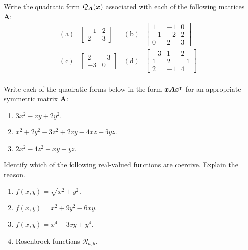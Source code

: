 \begin{problem}[Basic]\cite[p.31, \#3]{peressini1988mathematics}
Write the quadratic form $\mathcal{Q}_{\boldsymbol{A}}(\boldsymbol{x})$ associated with each of the following matrices $\boldsymbol{A}$:
\begin{align*}
\mathrm{(a)} & \begin{bmatrix} -1 & 2 \\ 2 & 3 \end{bmatrix} &
\mathrm{(b)} & \begin{bmatrix} 1 & -1 & 0 \\ -1 & -2 & 2 \\ 0 & 2 & 3 \end{bmatrix} \\
\mathrm{(c)} & \begin{bmatrix} 2 & -3 \\ -3 & 0 \end{bmatrix} &
\mathrm{(d)} & \begin{bmatrix} -3 & 1 & 2 \\ 1 & 2 & -1 \\ 2 & -1 & 4 \end{bmatrix} \\
\end{align*}
\end{problem}

\begin{problem}[Basic]\cite[p.32, \#4]{peressini1988mathematics}
Write each of the quadratic forms below in the form $\boldsymbol{x} \boldsymbol{A} {\boldsymbol{x}}^\intercal$ for an appropriate symmetric matrix $\boldsymbol{A}$:
\begin{enumerate}
\item $3x^2-xy+2y^2$.
\item $x^2+2y^2-3z^2+2xy-4xz+6yz$.
\item $2x^2-4z^2+xy-yz$.
\end{enumerate}
\end{problem}


\begin{problem}[Intermediate]
Identify which of the following real-valued functions are coercive.  Explain the reason.
\begin{enumerate}
	\item $f(x,y) = \sqrt{x^2+y^2}$.
	\item $f(x,y) = x^2 + 9y^2 - 6xy$.
	\item $f(x,y) = x^4 - 3xy +y^4$.
	\item Rosenbrock functions $\mathcal{R}_{a,b}$.
\end{enumerate}
\end{problem}


